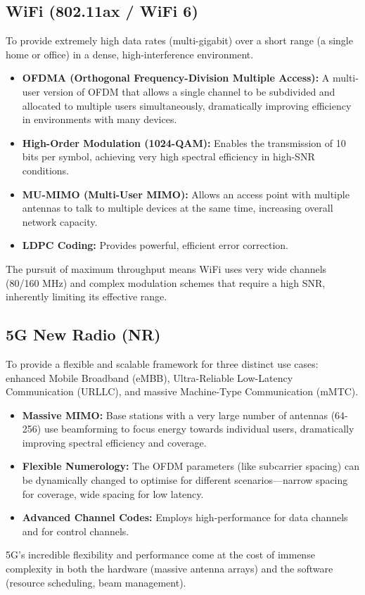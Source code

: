 \subsection{WiFi (802.11ax / WiFi 6)}

 To provide extremely high data rates (multi-gigabit) over a short range (a single home or office) in a dense, high-interference environment.
\begin{itemize}
    \item \textbf{OFDMA (Orthogonal Frequency-Division Multiple Access):} A multi-user version of OFDM that allows a single channel to be subdivided and allocated to multiple users simultaneously, dramatically improving efficiency in environments with many devices.
    \item \textbf{High-Order Modulation (1024-QAM):} Enables the transmission of 10 bits per symbol, achieving very high spectral efficiency in high-SNR conditions.
    \item \textbf{MU-MIMO (Multi-User MIMO):} Allows an access point with multiple antennas to talk to multiple devices at the same time, increasing overall network capacity.
    \item \textbf{LDPC Coding:} Provides powerful, efficient error correction.
\end{itemize}
 The pursuit of maximum throughput means WiFi uses very wide channels (80/160 MHz) and complex modulation schemes that require a high SNR, inherently limiting its effective range.


\subsection{5G New Radio (NR)}

 To provide a flexible and scalable framework for three distinct use cases: enhanced Mobile Broadband (eMBB), Ultra-Reliable Low-Latency Communication (URLLC), and massive Machine-Type Communication (mMTC).
\begin{itemize}
    \item \textbf{Massive MIMO:} Base stations with a very large number of antennas (64-256) use beamforming to focus energy towards individual users, dramatically improving spectral efficiency and coverage.
    \item \textbf{Flexible Numerology:} The OFDM parameters (like subcarrier spacing) can be dynamically changed to optimise for different scenarios—narrow spacing for coverage, wide spacing for low latency.
    \item \textbf{Advanced Channel Codes:} Employs high-performance  for data channels and  for control channels.
\end{itemize}
 5G's incredible flexibility and performance come at the cost of immense complexity in both the hardware (massive antenna arrays) and the software (resource scheduling, beam management).


